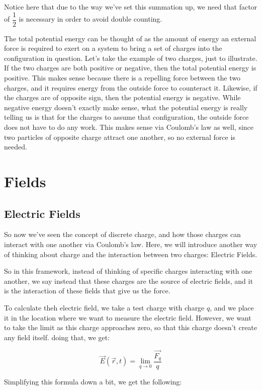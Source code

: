 \documentclass{report}
\theoremstyle{definition}
\numberwithin{equation}{section}
\numberwithin{definition}{section}
\begin{document}
    Notice here that due to the way we've set this summation up, we need that factor of $\dfrac{1}{2}$ is necessary in order to avoid double counting.

    The total potential energy can be thought of as the amount of energy an external force is required to exert on a system to bring a set of charges into the configuration in question. Let's take the example of two charges, just to illustrate. If the two charges are both positive or negative, then the total potential energy is positive. This makes sense because there is a repelling force between the two charges, and it requires energy from the outside force to counteract it. Likewise, if the charges are of opposite sign, then the potential energy is negative. While negative energy doesn't exactly make sense, what the potential energy is really telling us is that for the charges to assume that configuration, the outside force does not have to do any work. This makes sense via Coulomb's law as well, since two particles of opposite charge attract one another, so no external force is needed.

\chapter{Fields}

\section{Electric Fields}
    So now we've seen the concept of discrete charge, and how those charges can interact with one another via Coulomb's law. Here, we will introduce another way of thinking about charge and the interaction between two charges: Electric Fields. 

    So in this framework, instead of thinking of specific charges interacting with one another, we say instead that these charges are the source of electric fields, and it is the interaction of these fields that give us the force. 

    To calculate theh electric field, we take a test charge with charge $q$, and we place it in the location where we want to measure the electric field. However, we want to take the limit as this charge approaches zero, so that this charge doesn't create any field itself. doing that, we get:

    \[ \vec{E}(\vec{r}, t) = \lim_{q \to 0} \frac{\vec{F_q}}{q}\]

    Simplifying this formula down a bit, we get the following:
\end{document}
